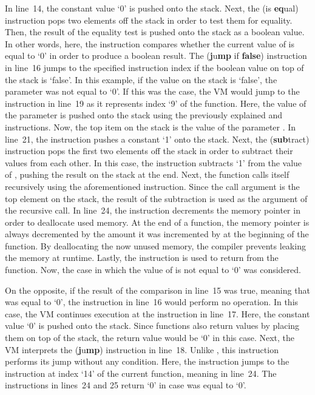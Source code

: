 In line~14, the constant value `0' is pushed onto the stack.
Next, the  (is \textbf{eq}ual) instruction pops two elements off the stack in order to test them for equality.
Then, the result of the equality test is pushed onto the stack as a boolean value.
In other words, here, the instruction compares whether the current value of  is equal to `0' in order to produce a boolean result.
The  (\textbf{j}u\textbf{mp} if \textbf{false}) instruction in line~16 jumps to the specified instruction index if the boolean value on top of the stack is `false'.
In this example, if the value on the stack is `false', the parameter  was not equal to `0'.
If this was the case, the VM would jump to the instruction in line~19 as it represents index `9' of the  function.
Here, the value of the parameter  is pushed onto the stack using the previously explained  and  instructions.
Now, the top item on the stack is the value of the parameter .
In line~21, the  instruction pushes a constant `1' onto the stack.
Next, the  (\textbf{sub}tract) instruction pops the first two elements off the stack in order to subtract their values from each other.
In this case, the instruction subtracts `1' from the value of , pushing the result on the stack at the end.
Next, the  function calls itself recursively using the aforementioned  instruction.
Since the call argument is the top element on the stack, the result of the subtraction is used as the argument of the recursive call.
In line~24, the  instruction decrements the memory pointer in order to deallocate used memory.
At the end of a function, the memory pointer is always decremented by the amount it was incremented by at the beginning of the function.
By deallocating the now unused memory, the compiler prevents leaking the memory at runtime.
Lastly, the  instruction is used to return from the  function.
Now, the case in which the value of  is not equal to `0' was considered.

On the opposite, if the result of the comparison in line~15 was true, meaning that  was equal to `0', the  instruction in line~16 would perform no operation.
In this case, the VM continues execution at the  instruction in line~17.
Here, the constant value `0' is pushed onto the stack.
Since functions also return values by placing them on top of the stack, the return value would be `0' in this case.
Next, the VM interprets the  (\textbf{j}u\textbf{mp}) instruction in line~18.
Unlike , this instruction performs its jump without any condition.
Here, the instruction jumps to the instruction at index `14' of the current function, meaning  in line~24.
The instructions in lines~24 and 25 return `0' in case  was equal to `0'.

